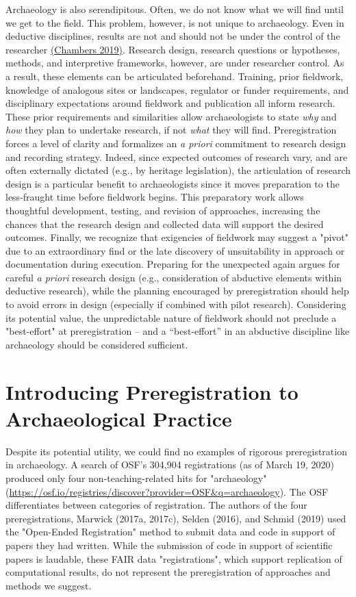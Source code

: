 \documentclass[article]{sa}
\begin{document}
Archaeology is also serendipitous. Often, we do not know what we will
find until we get to the field. This problem, however, is not unique to
archaeology. Even in deductive disciplines, results are not and should
not be under the control of the researcher
\href{https://paperpile.com/c/9nVMK6/0AqDV}{(Chambers 2019)}. Research
design, research questions or hypotheses, methods, and interpretive
frameworks, however, are under researcher control. As a result, these
elements can be articulated beforehand. Training, prior fieldwork,
knowledge of analogous sites or landscapes, regulator or funder
requirements, and disciplinary expectations around fieldwork and
publication all inform research. These prior requirements and
similarities allow archaeologists to state \emph{why} and \emph{how}
they plan to undertake research, if not \emph{what} they will find.
Preregistration forces a level of clarity and formalizes an \emph{a
priori} commitment to research design and recording strategy. Indeed,
since expected outcomes of research vary, and are often externally
dictated (e.g., by heritage legislation), the articulation of research
design is a particular benefit to archaeologists since it moves
preparation to the less-fraught time before fieldwork begins. This
preparatory work allows thoughtful development, testing, and revision of
approaches, increasing the chances that the research design and
collected data will support the desired outcomes. Finally, we recognize
that exigencies of fieldwork may suggest a "pivot" due to an
extraordinary find or the late discovery of unsuitability in approach or
documentation during execution. Preparing for the unexpected again
argues for careful \emph{a priori} research design (e.g., consideration
of abductive elements within deductive research), while the planning
encouraged by preregistration should help to avoid errors in design
(especially if combined with pilot research). Considering its potential
value, the unpredictable nature of fieldwork should not preclude a
"best-effort" at preregistration -- and a ``best-effort'' in an
abductive discipline like archaeology should be considered sufficient.

\section{Introducing Preregistration to
Archaeological Practice}

Despite its potential utility, we could find no examples of rigorous
preregistration in archaeology. A search of OSF's 304,904 registrations
(as of March 19, 2020) produced only four non-teaching-related hits for
"archaeology"
(\href{https://osf.io/registries/discover?provider=OSF\&q=archaeology}{{https://osf.io/registries/discover?provider=OSF\&q=archaeology}}).
The OSF differentiates between categories of registration. The authors
of the four preregistrations, Marwick (2017a, 2017c), Selden (2016), and
Schmid (2019) used the "Open-Ended Registration" method to submit data
and code in support of papers they had written. While the submission of
code in support of scientific papers is laudable, these FAIR data
"registrations", which support replication of computational results, do
not represent the preregistration of approaches and methods we suggest.
\end{document}
